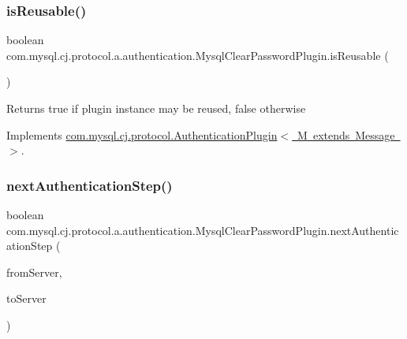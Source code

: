 \subsubsection{\texorpdfstring{is\+Reusable()}{isReusable()}}
{\footnotesize\ttfamily boolean com.\+mysql.\+cj.\+protocol.\+a.\+authentication.\+Mysql\+Clear\+Password\+Plugin.\+is\+Reusable (\begin{DoxyParamCaption}{ }\end{DoxyParamCaption})}

\begin{DoxyReturn}{Returns}
true if plugin instance may be reused, false otherwise 
\end{DoxyReturn}


Implements \mbox{\hyperlink{interfacecom_1_1mysql_1_1cj_1_1protocol_1_1_authentication_plugin_afff2eda7e67e6847d2401461100e2c69}{com.\+mysql.\+cj.\+protocol.\+Authentication\+Plugin$<$ M extends Message $>$}}.

\mbox{\label{classcom_1_1mysql_1_1cj_1_1protocol_1_1a_1_1authentication_1_1_mysql_clear_password_plugin_a960f58e4a3c7032cb49ff3c30cf069f8}} 
\subsubsection{\texorpdfstring{next\+Authentication\+Step()}{nextAuthenticationStep()}}
{\footnotesize\ttfamily boolean com.\+mysql.\+cj.\+protocol.\+a.\+authentication.\+Mysql\+Clear\+Password\+Plugin.\+next\+Authentication\+Step (\begin{DoxyParamCaption}\item[{\mbox{\hyperlink{classcom_1_1mysql_1_1cj_1_1protocol_1_1a_1_1_native_packet_payload}{Native\+Packet\+Payload}}}]{from\+Server,  }\item[{List$<$ \mbox{\hyperlink{classcom_1_1mysql_1_1cj_1_1protocol_1_1a_1_1_native_packet_payload}{Native\+Packet\+Payload}} $>$}]{to\+Server }\end{DoxyParamCaption})}

